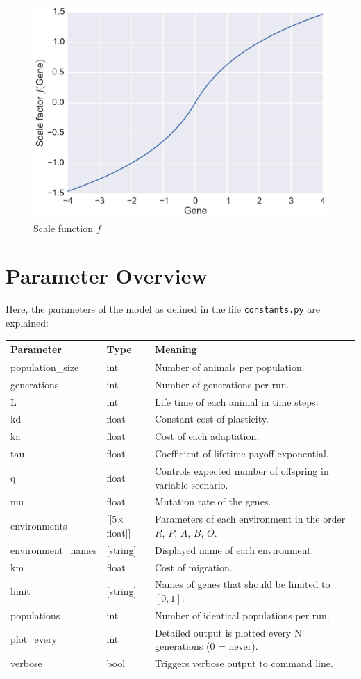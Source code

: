 \documentclass[
12pt, %
a4paper, %
headinclude,footinclude %
]{article}
\newcommand{\modfont}[1]{\begingroup\color{red}#1\endgroup}
\begin{document}
\begin{figure}
	\includegraphics[width=.9\textwidth]{scale}
	\caption{Scale function $f$}
	\label{fig:scale}
\end{figure}

\section{Parameter Overview}
Here, the parameters of the model as defined in the file \verb+constants.py+ are explained:

\vspace{20pt}
\begin{tabularx}{\linewidth}{l | l | X}
Parameter & Type & Meaning \\ \midrule
population\_size & int & Number of animals per population. \\
generations & int & Number of generations per run. \\
L & int & Life time of each animal in time steps. \\
kd & float & Constant cost of plasticity. \\
ka & float & Cost of each adaptation. \\
tau & float & Coefficient of lifetime payoff exponential. \\
q & float & Controls expected number of offspring in variable scenario. \\
mu & float & Mutation rate of the genes. \\
environments & [[5$\times$float]] & Parameters of each environment in the order $R$, $P$, $A$, $B$, $O$. \\
environment\_names & [string] & Displayed name of each environment. \\
\modfont{km} & float & Cost of migration. \\
\modfont{limit} & [string] & Names of genes that should be limited to $[0,1]$. \\
populations & int & Number of identical populations per run. \\
plot\_every & int & Detailed output is plotted every N generations (0 = never). \\
verbose & bool & Triggers verbose output to command line.
\end{tabularx}
\vspace{20pt}
\end{document}
